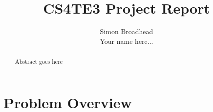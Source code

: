 \documentclass{report}
\begin{document}
\title{CS4TE3 Project Report}
\author{
    Simon Broadhead\\
    Your name here...
}
\maketitle

\begin{abstract}
Abstract goes here
\end{abstract}

\chapter{Problem Overview}


 
\end{document}
